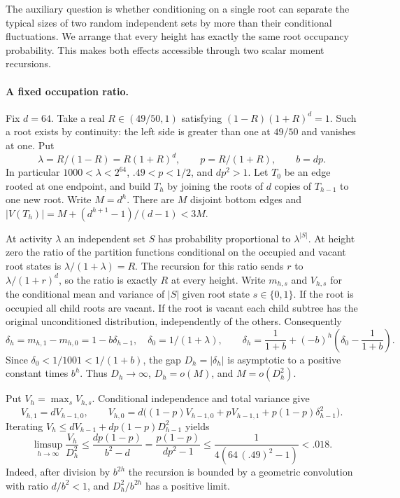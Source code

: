 \documentclass[11pt,a4paper]{article}
\numberwithin{equation}{section}
\begin{document}
The auxiliary question is whether conditioning on a single root can
separate the typical sizes of two random independent sets by more than
their conditional fluctuations. We arrange that every height has exactly
the same root occupancy probability. This makes both effects accessible
through two scalar moment recursions.

\paragraph{A fixed occupation ratio.}
Fix $d=64$. Take a real $R\in(49/50,1)$ satisfying
$(1-R)(1+R)^d=1$. Such a root exists by continuity:
the left side is greater than one at $49/50$ and vanishes at one.
Put
\[
 \lambda=R/(1-R)=R(1+R)^d,\qquad
 p=R/(1+R),\qquad b=dp.
\]
In particular $1000<\lambda<2^{64}$, $.49<p<1/2$, and $dp^2>1$.
Let $T_0$ be an edge rooted at one endpoint, and build $T_h$ by joining
the roots of $d$ copies of $T_{h-1}$ to one new root. Write $M=d^h$.
There are $M$ disjoint bottom edges and
$|V(T_h)|=M+(d^{h+1}-1)/(d-1)<3M$.

At activity $\lambda$ an independent set $S$ has probability
proportional to $\lambda^{|S|}$. At height zero the ratio of the
partition functions conditional on the occupied and vacant root states
is $\lambda/(1+\lambda)=R$. The recursion for this ratio sends $r$ to
$\lambda/(1+r)^d$, so the ratio is exactly $R$ at every height.
Write $m_{h,s}$ and $V_{h,s}$ for the conditional mean and variance
of $|S|$ given root state $s\in\{0,1\}$. If the root is occupied all
child roots are vacant. If the root is vacant each child subtree has the original
unconditioned distribution, independently of the others. Consequently
\[
 \delta_h=m_{h,1}-m_{h,0}=1-b\delta_{h-1},
 \quad \delta_0=1/(1+\lambda),\qquad
 \delta_h=\frac1{1+b}+(-b)^h
             \left(\delta_0-\frac1{1+b}\right).
\]
Since $\delta_0<1/1001<1/(1+b)$, the gap $D_h=|\delta_h|$ is
asymptotic to a positive constant times $b^h$. Thus $D_h\to\infty$,
$D_h=o(M)$, and $M=o(D_h^2)$.

Put $V_h=\max_sV_{h,s}$. Conditional independence and total variance give
\[
 V_{h,1}=dV_{h-1,0},\qquad
 V_{h,0}=d\big((1-p)V_{h-1,0}+pV_{h-1,1}
                    +p(1-p)\delta_{h-1}^2\big).
\]
Iterating $V_h\le dV_{h-1}+dp(1-p)D_{h-1}^2$ yields
\begin{equation}\label{eq:bulkvar}
 \limsup_{h\to\infty}\frac{V_h}{D_h^2}
 \le\frac{d p(1-p)}{b^2-d}
 =\frac{p(1-p)}{dp^2-1}
 \le\frac{1}{4(64\,(.49)^2-1)}<.018 .
\end{equation}
Indeed, after division by $b^{2h}$ the recursion is bounded by a geometric
convolution with ratio $d/b^2<1$, and $D_h^2/b^{2h}$ has a positive limit.
\end{document}
